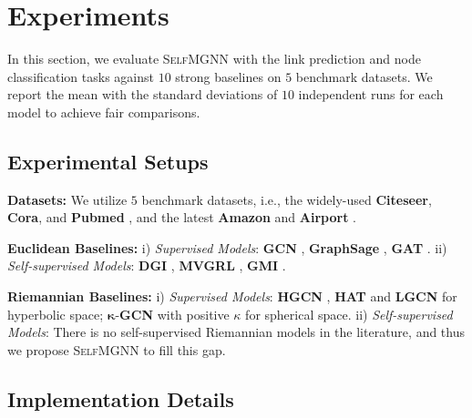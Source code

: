 

  
\section{Experiments}
In this section, we evaluate  \textsc{SelfMGNN} with the link prediction and node classification tasks against $10$ strong baselines on $5$ benchmark datasets. 
We report the mean with the standard deviations of $10$ independent runs for each model to achieve fair comparisons.

\subsection{Experimental Setups}
\noindent\textbf{Datasets:} We utilize $5$ benchmark datasets, i.e., 
the widely-used 
\textbf{Citeseer}, 
\textbf{Cora},
and
\textbf{Pubmed} \cite{kipf2016semi,VelickovicFHLBH19}, 
and the latest
\textbf{Amazon}
and
\textbf{Airport} \cite{ZhangWSLS21}.

\noindent\textbf{Euclidean Baselines:} %
i) \emph{Supervised Models}: 
\textbf{GCN} \cite{kipf2016semi},
\textbf{GraphSage} \cite{hamilton2017inductive},
\textbf{GAT} \cite{velickovic2018graph}.
ii) \emph{Self-supervised Models}: 
\textbf{DGI} \cite{VelickovicFHLBH19},
\textbf{MVGRL} \cite{HassaniA20},
\textbf{GMI} \cite{PengHLZRXH20}.

\noindent\textbf{Riemannian Baselines:}
i) \emph{Supervised Models}: 
\textbf{HGCN} \cite{HGCN}, 
\textbf{HAT} \cite{HAN}
and
\textbf{LGCN} \cite{ZhangWSLS21} for hyperbolic space; 
$\boldsymbol \kappa$-\textbf{GCN} \cite{BachmannBG20} with positive $\kappa$ for spherical space.
ii)  
\emph{Self-supervised Models}: There is no self-supervised Riemannian models in the literature, and thus we propose \textsc{SelfMGNN} to fill this gap.


\subsection{Implementation Details}

